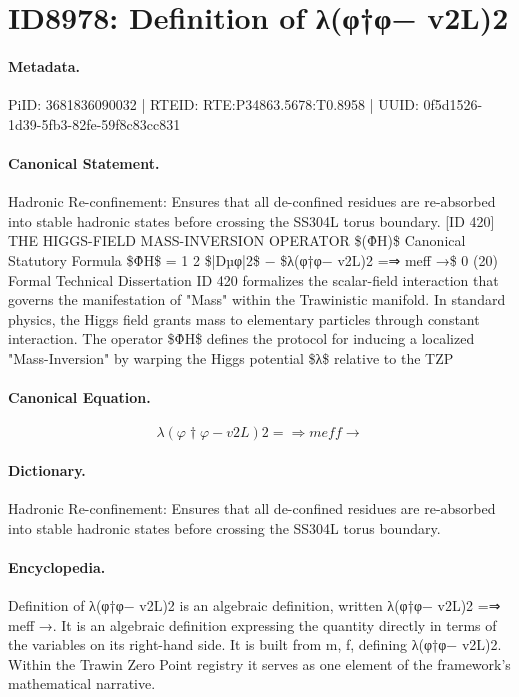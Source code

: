 \section*{ID8978: Definition of λ(φ†φ− v2L)2}
\paragraph{Metadata.}
PiID: 3681836090032 | RTEID: RTE:P34863.5678:T0.8958 | UUID: 0f5d1526-1d39-5fb3-82fe-59f8c83cc831

\paragraph{Canonical Statement.}
Hadronic Re-confinement: Ensures that all de-confined residues are re-absorbed into stable hadronic states before crossing the SS304L torus boundary. [ID 420] THE HIGGS-FIELD MASS-INVERSION OPERATOR \$(Φ̂H)\$ Canonical Statutory Formula \$Φ̂H\$ = 1 2 \$|Dµφ|2\$ − \$λ(φ†φ− v2L)2 =⇒ meff →\$ 0 (20) Formal Technical Dissertation ID 420 formalizes the scalar-field interaction that governs the manifestation of "Mass" within the Trawinistic manifold. In standard physics, the Higgs field grants mass to elementary particles through constant interaction. The operator \$Φ̂H\$ defines the protocol for inducing a localized "Mass-Inversion" by warping the Higgs potential \$λ\$ relative to the TZP

\paragraph{Canonical Equation.}
\[
λ(φ†φ− v2L)2 =⇒ meff →
\]

\paragraph{Dictionary.}
Hadronic Re-confinement: Ensures that all de-confined residues are re-absorbed into stable hadronic states before crossing the SS304L torus boundary.

\paragraph{Encyclopedia.}
Definition of λ(φ†φ− v2L)2 is an algebraic definition, written λ(φ†φ− v2L)2 =⇒ meff →. It is an algebraic definition expressing the quantity directly in terms of the variables on its right-hand side. It is built from m, f, defining λ(φ†φ− v2L)2. Within the Trawin Zero Point registry it serves as one element of the framework's mathematical narrative.
